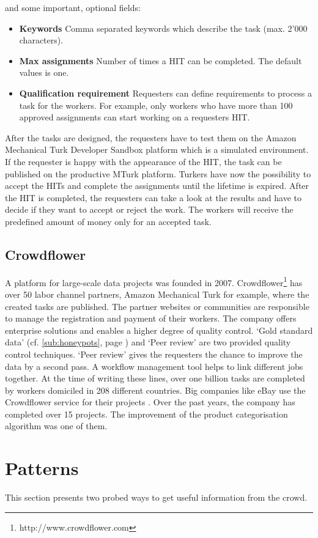 and some important, optional fields: 
\begin{itemize}
	\item \textbf{Keywords} Comma separated keywords which describe the task (max. 2'000 characters). 
	\item \textbf{Max assignments} Number of times a HIT can be completed. The default values is one. 
	\item \textbf{Qualification requirement} Requesters can define requirements to process a task for the workers. For example, only workers who have more than 100 approved assignments can start working on a requesters HIT. 
\end{itemize}
After the tasks are designed, the requesters have to test them on the Amazon Mechanical Turk Developer Sandbox platform which is a simulated environment. If the requester is happy with the appearance of the HIT, the task can be published on the productive MTurk platform. Turkers have now the possibility to accept the HITs and complete the assignments until the lifetime is expired. After the HIT is completed, the requesters can take a look at the results and have to decide if they want to accept or reject the work. The workers will receive the predefined amount of money only for an accepted task. 

\subsection{Crowdflower}
A platform for large-scale data projects was founded in 2007. Crowdflower\footnote{http://www.crowdflower.com} has over 50 labor channel partners, Amazon Mechanical Turk for example, where the created tasks are published. The partner websites or communities are responsible to manage the registration and payment of their workers. The company offers enterprise solutions and enables a higher degree of quality control. `Gold standard data' (cf. \ref{sub:honeypots}, page \pageref{sub:honeypots}) and `Peer review' are two provided quality control techniques. `Peer review' gives the requesters the chance to improve the data by a second pass. A workflow management tool helps to link different jobs together. At the time of writing these lines, over one billion tasks are completed by workers domiciled in 208 different countries. Big companies like eBay use the Crowdflower service for their projects \cite{crowdflower_casestudy}. Over the past years, the company has completed over 15 projects. The improvement of the product categorisation algorithm was one of them.
\section{Patterns}
This section presents two probed ways to get useful information from the crowd.
